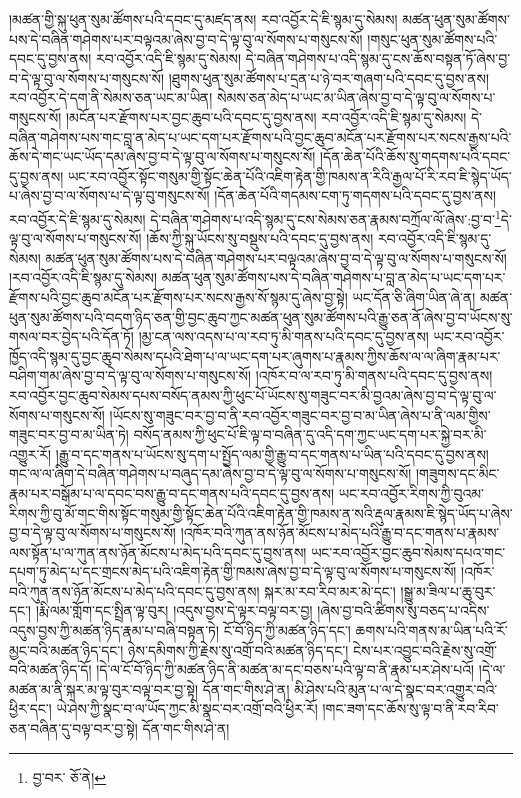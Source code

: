 །མཚན་གྱི་སྐུ་ཕུན་སུམ་ཚོགས་པའི་དབང་དུ་མཛད་ནས། རབ་འབྱོར་དེ་ཇི་སྙམ་དུ་སེམས། མཚན་ཕུན་སུམ་ཚོགས་པས་དེ་བཞིན་གཤེགས་པར་བལྟའམ་ཞེས་བྱ་བ་དེ་ལྟ་བུ་ལ་སོགས་པ་གསུངས་སོ། །གསུང་ཕུན་སུམ་ཚོགས་པའི་དབང་དུ་བྱས་ནས། རབ་འབྱོར་འདི་ཇི་སྙམ་དུ་སེམས། དེ་བཞིན་གཤེགས་པ་འདི་སྙམ་དུ་ངས་ཆོས་བསྟན་ཏོ་ཞེས་བྱ་བ་དེ་ལྟ་བུ་ལ་སོགས་པ་གསུངས་སོ། །ཐུགས་ཕུན་སུམ་ཚོགས་པ་དྲན་པ་ཉེ་བར་གཞག་པའི་དབང་དུ་བྱས་ནས། རབ་འབྱོར་དེ་དག་ནི་སེམས་ཅན་ཡང་མ་ཡིན། སེམས་ཅན་མེད་པ་ཡང་མ་ཡིན་ཞེས་བྱ་བ་དེ་ལྟ་བུ་ལ་སོགས་པ་གསུངས་སོ། །མངོན་པར་རྫོགས་པར་བྱང་ཆུབ་པའི་དབང་དུ་བྱས་ནས། རབ་འབྱོར་འདི་ཇི་སྙམ་དུ་སེམས། དེ་བཞིན་གཤེགས་པས་གང་བླ་ན་མེད་པ་ཡང་དག་པར་རྫོགས་པའི་བྱང་ཆུབ་མངོན་པར་རྫོགས་པར་སངས་རྒྱས་པའི་ཆོས་དེ་གང་ཡང་ཡོད་དམ་ཞེས་བྱ་བ་དེ་ལྟ་བུ་ལ་སོགས་པ་གསུངས་སོ། །དོན་ཆེན་པོའི་ཆོས་སུ་གདགས་པའི་དབང་དུ་བྱས་ནས། ཡང་རབ་འབྱོར་སྟོང་གསུམ་གྱི་སྟོང་ཆེན་པོའི་འཇིག་རྟེན་གྱི་ཁམས་ན་རིའི་རྒྱལ་པོ་རི་རབ་ཇི་སྙེད་ཡོད་པ་ཞེས་བྱ་བ་ལ་སོགས་པ་དེ་ལྟ་བུ་གསུངས་སོ། །དོན་ཆེན་པོའི་གདམས་ངག་ཏུ་གདགས་པའི་དབང་དུ་བྱས་ནས། རབ་འབྱོར་དེ་ཇི་སྙམ་དུ་སེམས། དེ་བཞིན་གཤེགས་པ་འདི་སྙམ་དུ་ངས་སེམས་ཅན་རྣམས་བཀྲོལ་ལོ་ཞེས་:བྱ་བ་\footnote{བྱ་བར་  ཅོ་ནེ། }དེ་ལྟ་བུ་ལ་སོགས་པ་གསུངས་སོ། །ཆོས་ཀྱི་སྐུ་ཡོངས་སུ་བསྡུས་པའི་དབང་དུ་བྱས་ནས། རབ་འབྱོར་འདི་ཇི་སྙམ་དུ་སེམས། མཚན་ཕུན་སུམ་ཚོགས་པས་དེ་བཞིན་གཤེགས་པར་བལྟའམ་ཞེས་བྱ་བ་དེ་ལྟ་བུ་ལ་སོགས་པ་གསུངས་སོ། །རབ་འབྱོར་འདི་ཇི་སྙམ་དུ་སེམས། མཚན་ཕུན་སུམ་ཚོགས་པས་དེ་བཞིན་གཤེགས་པ་བླ་ན་མེད་པ་ཡང་དག་པར་རྫོགས་པའི་བྱང་ཆུབ་མངོན་པར་རྫོགས་པར་སངས་རྒྱས་སོ་སྙམ་དུ་ཞེས་བྱ་སྟེ། ཡང་དོན་ཅི་ཞིག་ཡིན་ཞེ་ན། མཚན་ཕུན་སུམ་ཚོགས་པའི་བདག་ཉིད་ཅན་གྱི་བྱང་ཆུབ་ཀྱང་མཚན་ཕུན་སུམ་ཚོགས་པའི་རྒྱུ་ཅན་ནོ་ཞེས་བྱ་བ་ཡོངས་སུ་གསལ་བར་བྱེད་པའི་དོན་ཏོ། །མྱ་ངན་ལས་འདས་པ་ལ་རབ་ཏུ་མི་གནས་པའི་དབང་དུ་བྱས་ནས། ཡང་རབ་འབྱོར་ཁྱོད་འདི་སྙམ་དུ་བྱང་ཆུབ་སེམས་དཔའི་ཐེག་པ་ལ་ཡང་དག་པར་ཞུགས་པ་རྣམས་ཀྱིས་ཆོས་ལ་ལ་ཞིག་རྣམ་པར་བཤིག་གམ་ཞེས་བྱ་བ་དེ་ལྟ་བུ་ལ་སོགས་པ་གསུངས་སོ། །འཁོར་བ་ལ་རབ་ཏུ་མི་གནས་པའི་དབང་དུ་བྱས་ནས། རབ་འབྱོར་བྱང་ཆུབ་སེམས་དཔས་བསོད་ནམས་ཀྱི་ཕུང་པོ་ཡོངས་སུ་གཟུང་བར་མི་བྱའམ་ཞེས་བྱ་བ་དེ་ལྟ་བུ་ལ་སོགས་པ་གསུངས་སོ། །ཡོངས་སུ་གཟུང་བར་བྱ་བ་ནི་རབ་འབྱོར་གཟུང་བར་བྱ་བ་མ་ཡིན་ཞེས་པ་ནི་ལམ་གྱིས་གཟུང་བར་བྱ་བ་མ་ཡིན་ཏེ། བསོད་ནམས་ཀྱི་ཕུང་པོ་ཇི་ལྟ་བ་བཞིན་དུ་འདི་དག་ཀྱང་ཡང་དག་པར་སྐྱེ་བར་མི་འགྱུར་རོ། །རྒྱུ་བ་དང་གནས་པ་ཡོངས་སུ་དག་པ་སྤྱོད་ལམ་གྱི་རྒྱུ་བ་དང་གནས་པ་ཡིན་པའི་དབང་དུ་བྱས་ནས། གང་ལ་ལ་ཞིག་དེ་བཞིན་གཤེགས་པ་བཞུད་དམ་ཞེས་བྱ་བ་དེ་ལྟ་བུ་ལ་སོགས་པ་གསུངས་སོ། །གཟུགས་དང་མིང་རྣམ་པར་བསྒོམ་པ་ལ་དབང་བས་རྒྱུ་བ་དང་གནས་པའི་དབང་དུ་བྱས་ནས། ཡང་རབ་འབྱོར་རིགས་ཀྱི་བུའམ་རིགས་ཀྱི་བུ་མོ་གང་གིས་སྟོང་གསུམ་གྱི་སྟོང་ཆེན་པོའི་འཇིག་རྟེན་གྱི་ཁམས་ན་སའི་རྡུལ་རྣམས་ཇི་སྙེད་ཡོད་པ་ཞེས་བྱ་བ་དེ་ལྟ་བུ་ལ་སོགས་པ་གསུངས་སོ། །འཁོར་བའི་ཀུན་ནས་ཉོན་མོངས་པ་མེད་པའི་རྒྱུ་བ་དང་གནས་པ་རྣམས་ལས་སྟོན་པ་ལ་ཀུན་ནས་ཉོན་མོངས་པ་མེད་པའི་དབང་དུ་བྱས་ནས། ཡང་རབ་འབྱོར་བྱང་ཆུབ་སེམས་དཔའ་གང་དཔག་ཏུ་མེད་པ་དང་གྲངས་མེད་པའི་འཇིག་རྟེན་གྱི་ཁམས་ཞེས་བྱ་བ་དེ་ལྟ་བུ་ལ་སོགས་པ་གསུངས་སོ། །འཁོར་བའི་ཀུན་ནས་ཉོན་མོངས་པ་མེད་པའི་དབང་དུ་བྱས་ནས། སྐར་མ་རབ་རིབ་མར་མེ་དང་། །སྒྱུ་མ་ཟིལ་པ་ཆུ་བུར་དང་། །རྨི་ལམ་གློག་དང་སྤྲིན་ལྟ་བུར། །འདུས་བྱས་དེ་ལྟར་བལྟ་བར་བྱ། །ཞེས་བྱ་བའི་ཚིགས་སུ་བཅད་པ་འདིས་འདུས་བྱས་ཀྱི་མཚན་ཉིད་རྣམ་པ་བཞི་བསྟན་ཏེ། ངོ་བོ་ཉིད་ཀྱི་མཚན་ཉིད་དང་། ཆགས་པའི་གནས་མ་ཡིན་པའི་རོ་མྱང་བའི་མཚན་ཉིད་དང་། ཉེས་དམིགས་ཀྱི་རྗེས་སུ་འགྲོ་བའི་མཚན་ཉིད་དང་། ངེས་པར་འབྱུང་བའི་རྗེས་སུ་འགྲོ་བའི་མཚན་ཉིད་དོ། །དེ་ལ་ངོ་བོ་ཉིད་ཀྱི་མཚན་ཉིད་ནི་མཚན་མ་དང་བཅས་པའི་ལྟ་བ་ནི་རྣམ་པར་ཤེས་པའོ། །དེ་ལ་མཚན་མ་ནི་སྐར་མ་ལྟ་བུར་བལྟ་བར་བྱ་སྟེ། དོན་གང་གིས་ཤེ་ན། མི་ཤེས་པའི་མུན་པ་ལ་དེ་སྣང་བར་འགྱུར་བའི་ཕྱིར་དང་། ཡེ་ཤེས་ཀྱི་སྣང་བ་ལ་ཡོད་ཀྱང་མི་སྣང་བར་འགྲོ་བའི་ཕྱིར་རོ། །གང་ཟག་དང་ཆོས་སུ་ལྟ་བ་ནི་རབ་རིབ་ཅན་བཞིན་དུ་བལྟ་བར་བྱ་སྟེ། དོན་གང་གིས་ཤེ་ན། 